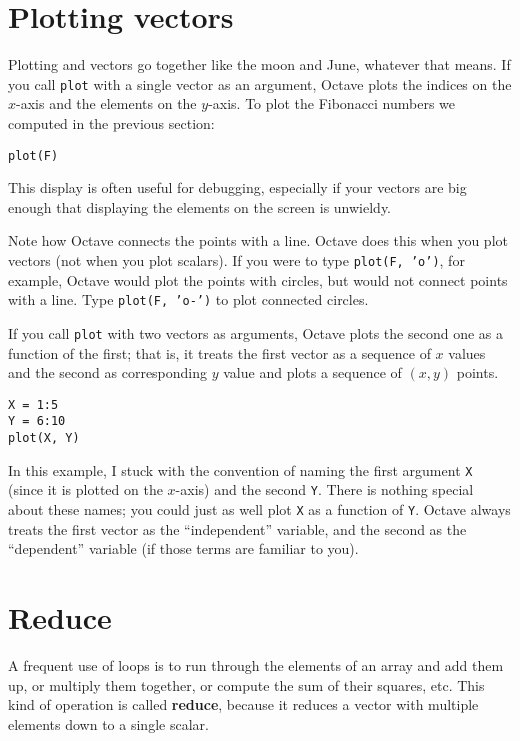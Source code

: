 \section{Plotting vectors}

Plotting and vectors go together like the moon and June, whatever that
means. If you call {\tt plot} with a single vector as an argument,
Octave plots the indices on the $x$-axis and the elements on the
$y$-axis. To plot the Fibonacci numbers we computed in the previous
section:

\begin{verbatim}
plot(F)
\end{verbatim}

This display is often useful for debugging, especially
if your vectors are big enough that displaying the elements on
the screen is unwieldy.

Note how Octave connects the points with a line. Octave does this when you plot
vectors (not when you plot scalars). If you were to type {\tt plot(F, 'o')},
for example, Octave would plot the points with circles, but would not connect
points with a line. Type {\tt plot(F, 'o-')} to plot connected circles.

If you call {\tt plot} with two vectors as arguments, Octave plots
the second one as a function of the first; that is, it treats
the first vector as a sequence of $x$ values and the second as
corresponding $y$ value and plots a sequence of $(x, y)$ points.

\begin{verbatim}
X = 1:5
Y = 6:10
plot(X, Y)
\end{verbatim}

In this example, I stuck with the convention of naming the first
argument {\tt X} (since it is plotted on the $x$-axis) and the
second {\tt Y}. There is nothing special about these names;
you could just as well plot {\tt X} as a function of {\tt Y}.
Octave always treats the first vector as the ``independent''
variable, and the second as the ``dependent'' variable (if those
terms are familiar to you).



\section{Reduce}
\label{reduce}

A frequent use of loops is to run through the elements of an array
and add them up, or multiply them together, or compute the sum
of their squares, etc. This kind of operation is called {\bf reduce},
because it reduces a vector with multiple elements down to a single
scalar.

